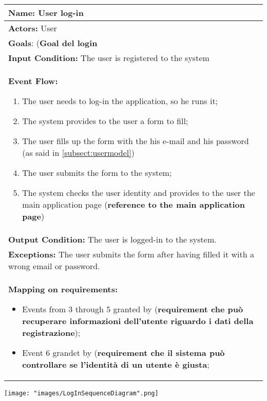 \begin{tabular}{|p{14cm}|} \hline

\textbf{Name:} User log-in \\ \hline

\textbf{Actors:} User \\ \hline

\textbf{Goals}: (\textbf{Goal del login} \\ \hline

\textbf{Input Condition:} The user is registered to the system \\ \hline

\textbf{Event Flow:} 

\begin{enumerate}
\item The user needs to log-in the application, so he runs it;
\item The system provides to the user a form to fill;
\item The user fills up the form with the his e-mail and his password (as said in \ref{subsect:usermodel})
\item The user submits the form to the system;
\item The system checks the user identity and provides to the user the main application page (\textbf{reference to the main application page})
\end{enumerate} \\ \hline

\textbf{Output Condition:} The user is logged-in to the system. \\ \hline

\textbf{Exceptions:} The user submits the form after having filled it with a wrong email or password. \\ \hline

\textbf{Mapping on requirements:}

\begin{itemize}
\item Events from 3 through 5 granted by (\textbf{requirement che può recuperare informazioni dell'utente riguardo i dati della registrazione});
\item Event 6 grandet by (\textbf{requirement che il sistema può controllare se l'identità di un utente è giusta};
\end{itemize} \\ \hline

\end{tabular}

\texttt{[image: "images/LogInSequenceDiagram".png]}

